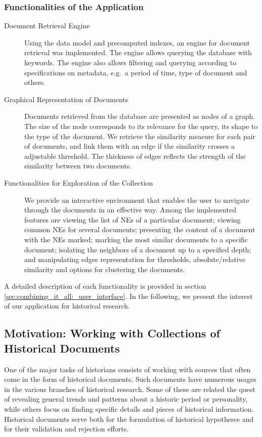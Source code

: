 \subsubsection{Functionalities of the Application}
\begin{description}
\item[Document Retrieval Engine] Using the data model and precomputed indexes, an engine for document retrieval was implemented. 
The engine allows querying the database with keywords. The engine also allows filtering and querying according to specifications on metadata, e.g.\ a period of time, type of document and others. 
\item[Graphical Representation of Documents] Documents retrieved from the database are presented as nodes of a graph. The size of the node corresponds to its relevance for the query, its shape to the type of the document. We retrieve the similarity measure for each pair of documents, and link them with an edge if the similarity crosses a adjustable threshold. The thickness of edges reflects the strength of the similarity between two documents.
\item[Functionalities for Exploration of the Collection] We provide an interactive environment that enables the user to navigate through the documents in an effective way. Among the implemented features are viewing the list of NEs of a particular document; viewing common NEs for several documents; presenting the content of a document with the NEs marked; marking the most similar documents to a specific document; isolating the neighbors of a document up to a specified depth; and manipulating edges representation for thresholds, absolute/relative similarity and options for clustering the documents.
\end{description}

A detailed description of each functionality is provided in section \ref{sec:combining_it_all:_user_interface}. In the following, we present the interest of our application for historical research. 

\subsection{Motivation: Working with Collections of Historical Documents}
\label{sec:motivation}
One of the major tasks of historians consists of working with sources that often come in the form of historical documents. 
Such documents have numerous usages in the various branches of historical research. Some of these are related the quest of revealing 
general trends and patterns about a historic period or personality, while others focus on finding specific details and pieces of historical 
information. Historical documents serve both for the formulation of historical hypotheses and for their validation and rejection efforts. 

